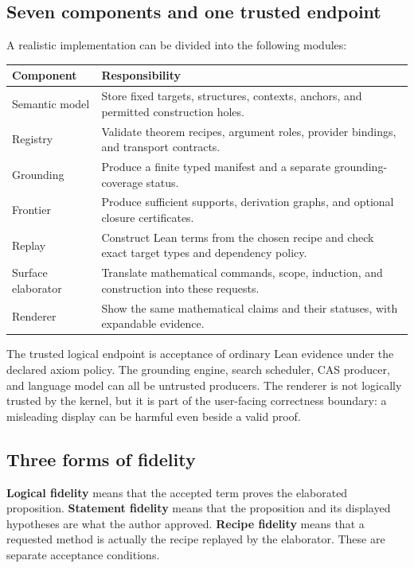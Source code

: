 \documentclass[11pt,a4paper]{article}
\theoremstyle{definition}\newtheorem{definition}[theorem]{Definition}
\theoremstyle{remark}\newtheorem{remark}[theorem]{Remark}
\begin{document}
\subsection{Seven components and one trusted endpoint}
A realistic implementation can be divided into the following modules:
\begin{center}\small
\begin{tabularx}{\textwidth}{@{}L{29mm}Y@{}}\toprule
Component & Responsibility\\\midrule
Semantic model & Store fixed targets, structures, contexts, anchors, and permitted construction holes.\\
Registry & Validate theorem recipes, argument roles, provider bindings, and transport contracts.\\
Grounding & Produce a finite typed manifest and a separate grounding-coverage status.\\
Frontier & Produce sufficient supports, derivation graphs, and optional closure certificates.\\
Replay & Construct Lean terms from the chosen recipe and check exact target types and dependency policy.\\
Surface elaborator & Translate mathematical commands, scope, induction, and construction into these requests.\\
Renderer & Show the same mathematical claims and their statuses, with expandable evidence.\\\bottomrule
\end{tabularx}
\end{center}
The trusted logical endpoint is acceptance of ordinary Lean evidence under the declared axiom policy. The grounding engine, search scheduler, CAS producer, and language model can all be untrusted producers. The renderer is not logically trusted by the kernel, but it is part of the user-facing correctness boundary: a misleading display can be harmful even beside a valid proof.

\subsection{Three forms of fidelity}
\textbf{Logical fidelity} means that the accepted term proves the elaborated proposition. \textbf{Statement fidelity} means that the proposition and its displayed hypotheses are what the author approved. \textbf{Recipe fidelity} means that a requested method is actually the recipe replayed by the elaborator. These are separate acceptance conditions.
\end{document}
